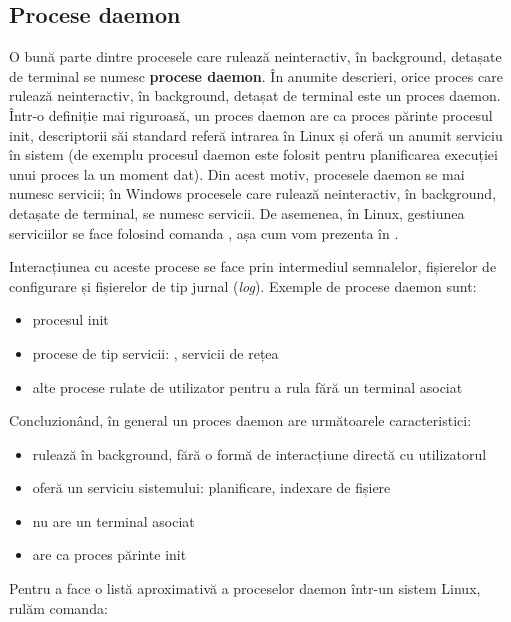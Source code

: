 \subsection{Procese daemon}
\label{sec:process:daemon}

O bună parte dintre procesele care rulează neinteractiv, în background, detașate de terminal se numesc \textbf{procese daemon}.
În anumite descrieri, orice proces care rulează neinteractiv, în background, detașat de terminal este un proces daemon.
Într-o definiție mai riguroasă, un proces daemon are ca proces părinte procesul init, descriptorii săi standard referă intrarea  în Linux și oferă un anumit serviciu în sistem (de exemplu procesul daemon  este folosit pentru planificarea execuției unui proces la un moment dat).
Din acest motiv, procesele daemon se mai numesc servicii;
în Windows procesele care rulează neinteractiv, în background, detașate de terminal, se numesc servicii.
De asemenea, în Linux, gestiunea serviciilor se face folosind comanda , așa cum vom prezenta în .

Interacțiunea cu aceste procese se face prin intermediul semnalelor, fișierelor de configurare și fișierelor de tip jurnal (\textit{log}).
Exemple de procese daemon sunt:

\begin{itemize}
  \item procesul init
  \item procese de tip servicii: , servicii de rețea
  \item alte procese rulate de utilizator pentru a rula fără un terminal asociat
\end{itemize}

Concluzionând, în general un proces daemon are următoarele caracteristici:

\begin{itemize}
  \item rulează în background, fără o formă de interacțiune directă cu utilizatorul
  \item oferă un serviciu sistemului: planificare, indexare de fișiere
  \item nu are un terminal asociat
  \item are ca proces părinte init
\end{itemize}

Pentru a face o listă aproximativă a proceselor daemon într-un sistem Linux, rulăm comanda:


